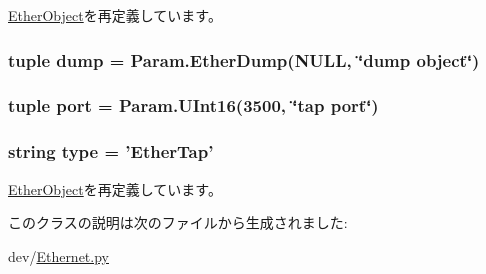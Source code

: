 \hyperlink{classEthernet_1_1EtherObject_a17da7064bc5c518791f0c891eff05fda}{EtherObject}を再定義しています。\hypertarget{classEthernet_1_1EtherTap_aef8d0e67d5fcd75abc7d08ee1952b0de}{
\subsubsection[{dump}]{\setlength{\rightskip}{0pt plus 5cm}tuple {\bf dump} = Param.EtherDump(NULL, \char`\"{}dump object\char`\"{})}}
\label{classEthernet_1_1EtherTap_aef8d0e67d5fcd75abc7d08ee1952b0de}
\hypertarget{classEthernet_1_1EtherTap_a1aadf525515ecfcf662c2aa51a503763}{
\subsubsection[{port}]{\setlength{\rightskip}{0pt plus 5cm}tuple {\bf port} = Param.UInt16(3500, \char`\"{}tap {\bf port}\char`\"{})}}
\label{classEthernet_1_1EtherTap_a1aadf525515ecfcf662c2aa51a503763}
\hypertarget{classEthernet_1_1EtherTap_acce15679d830831b0bbe8ebc2a60b2ca}{
\subsubsection[{type}]{\setlength{\rightskip}{0pt plus 5cm}string {\bf type} = '{\bf EtherTap}'}}
\label{classEthernet_1_1EtherTap_acce15679d830831b0bbe8ebc2a60b2ca}


\hyperlink{classEthernet_1_1EtherObject_acce15679d830831b0bbe8ebc2a60b2ca}{EtherObject}を再定義しています。

このクラスの説明は次のファイルから生成されました:\begin{DoxyCompactItemize}
\item 
dev/\hyperlink{Ethernet_8py}{Ethernet.py}\end{DoxyCompactItemize}
